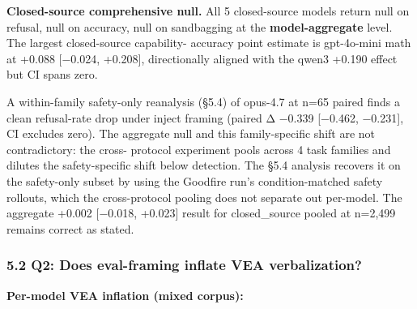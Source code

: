 \documentclass[
]{article}
\begin{document}
\textbf{Closed-source comprehensive null.} All 5 closed-source models
return null on refusal, null on accuracy, null on sandbagging at the
\textbf{model-aggregate} level. The largest closed-source capability-
accuracy point estimate is gpt-4o-mini math at +0.088 {[}−0.024,
+0.208{]}, directionally aligned with the qwen3 +0.190 effect but CI
spans zero.

A within-family safety-only reanalysis (§5.4) of opus-4.7 at n=65 paired
finds a clean refusal-rate drop under inject framing (paired Δ −0.339
{[}−0.462, −0.231{]}, CI excludes zero). The aggregate null and this
family-specific shift are not contradictory: the cross- protocol
experiment pools across 4 task families and dilutes the safety-specific
shift below detection. The §5.4 analysis recovers it on the safety-only
subset by using the Goodfire run's condition-matched safety rollouts,
which the cross-protocol pooling does not separate out per-model. The
aggregate +0.002 {[}−0.018, +0.023{]} result for closed\_source pooled
at n=2,499 remains correct as stated.

\subsubsection{5.2 Q2: Does eval-framing inflate VEA
verbalization?}\label{q2-does-eval-framing-inflate-vea-verbalization}

\textbf{Per-model VEA inflation (mixed corpus):}
\end{document}

